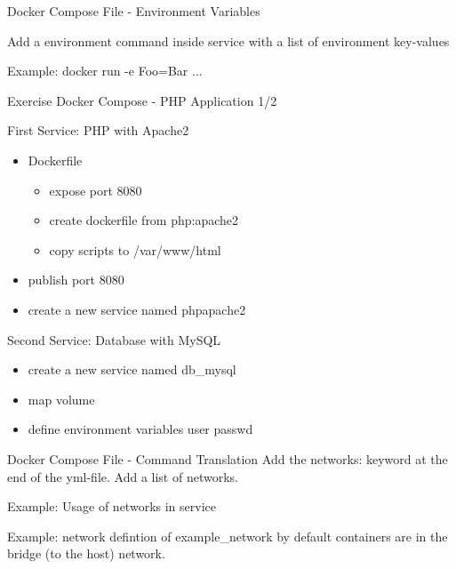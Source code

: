 \documentclass[10pt,aspectratio=\ratio,
compress
]{beamer}
\begin{document}
\begin{frame}{Docker Compose File - Environment Variables}

Add a environment command inside service with a list of environment key-values

Example: docker run -e Foo=Bar ...

\end{frame}




\begin{frame}{Exercise Docker Compose - PHP Application 1/2}


First Service: PHP with Apache2
\begin{itemize}
	\item Dockerfile
	\begin{itemize}
			\item expose port 8080
			\item create dockerfile from php:apache2
			\item copy scripts to /var/www/html
	\end{itemize}
	\item publish port 8080
	\item create a new service named phpapache2
\end{itemize}
Second Service: Database with MySQL
\begin{itemize}
	\item create a new service named db\_mysql
	\item map volume
	\item define environment variables user passwd
\end{itemize}

\end{frame}

\begin{frame}{Docker Compose File - Command Translation}
Add the networks: keyword at the end of the yml-file.
Add a list of networks.

Example: Usage of networks in service


Example: network defintion of example\_network
by default containers are in the bridge (to the host) network.
\end{frame}
\end{document}

